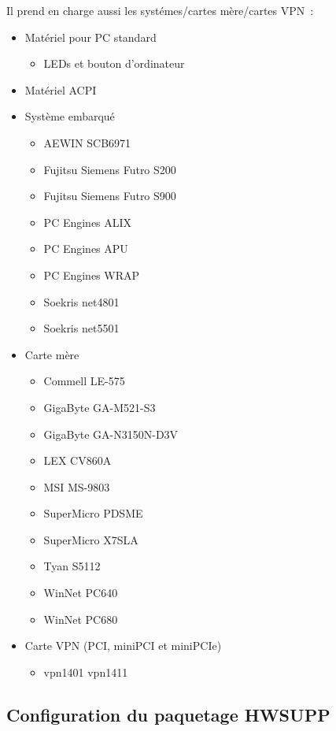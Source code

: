 Il prend en charge aussi les systémes/cartes mère/cartes VPN~:
\begin{itemize}
  \item Matériel pour PC standard
  \begin{itemize}
    \item LEDs et bouton d'ordinateur
  \end{itemize}
  \item Matériel ACPI
  \item Système embarqué
  \begin{itemize}
    \item AEWIN SCB6971
    \item Fujitsu Siemens Futro S200
    \item Fujitsu Siemens Futro S900
    \item PC Engines ALIX
    \item PC Engines APU
    \item PC Engines WRAP
    \item Soekris net4801
    \item Soekris net5501
  \end{itemize}
  \item Carte mère
  \begin{itemize}
    \item Commell LE-575
    \item GigaByte GA-M521-S3
    \item GigaByte GA-N3150N-D3V
    \item LEX CV860A
    \item MSI MS-9803
    \item SuperMicro PDSME
    \item SuperMicro X7SLA
    \item Tyan S5112
    \item WinNet PC640
    \item WinNet PC680
  \end{itemize}
    \item Carte VPN (PCI, miniPCI et miniPCIe)
  \begin{itemize}
    \item vpn1401 vpn1411
  \end{itemize}
\end{itemize}

\subsection {Configuration du paquetage HWSUPP}

